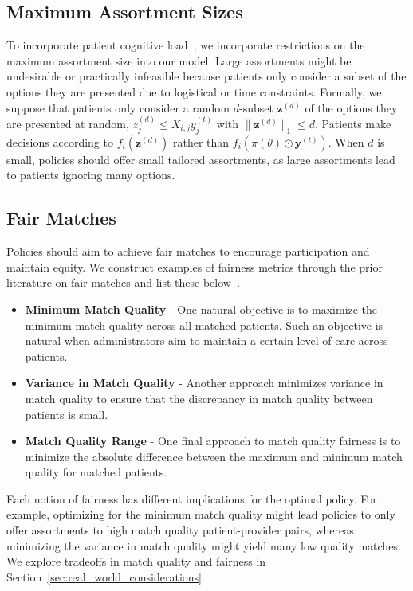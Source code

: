 \subsection{Maximum Assortment Sizes}
\label{sec:choice_overload}
To incorporate patient cognitive load~\citep{choice_overload}, we incorporate restrictions on the maximum assortment size into our model.
Large assortments might be undesirable or practically infeasible because patients only consider a subset of the options they are presented due to logistical or time constraints. 
Formally, we suppose that patients only consider a random $d$-subset $\mathbf{z}^{(d)}$ of the options they are presented at random, $z^{(d)}_{j} \leq X_{i,j} y^{(t)}_{j}$ with $\lVert \mathbf{z}^{(d)} \rVert_{1} \leq d$. 
Patients make decisions according to $f_{i}(\mathbf{z}^{(d)})$ rather than $f_{i}(\pi(\theta) \odot \mathbf{y}^{(t)})$. 
When $d$ is small, policies should offer small tailored assortments, as large assortments lead to patients ignoring many options. 

\subsection{Fair Matches}
\label{sec:fair}
Policies should aim to achieve fair matches to encourage participation and maintain equity. 
We construct examples of fairness metrics through the prior literature on fair matches and list these below~\citep{fairness_optimization,fair_minimax}. 
\begin{itemize}
    \item \textbf{Minimum Match Quality} - One natural objective is to maximize the minimum match quality across all matched patients. Such an objective is natural when administrators aim to maintain a certain level of care across patients. 
    \item \textbf{Variance in Match Quality} - Another approach minimizes variance in match quality to ensure that the discrepancy in match quality between patients is small. 
    \item \textbf{Match Quality Range} - One final approach to match quality fairness is to minimize the absolute difference between the maximum and minimum match quality for matched patients. 
\end{itemize}
Each notion of fairness has different implications for the optimal policy. 
For example, optimizing for the minimum match quality might lead policies to only offer assortments to high match quality patient-provider pairs, whereas minimizing the variance in match quality might yield many low quality matches.  
We explore tradeoffs in match quality and fairness in Section~\ref{sec:real_world_considerations}. 